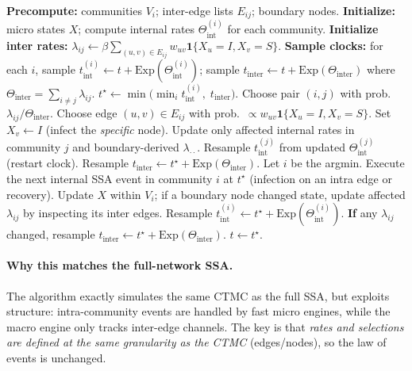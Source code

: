 \documentclass[11pt,a4paper]{article}
\begin{document}
\begin{algorithm}[h]
\caption{Exact micro--macro SSA for inter-community transmission (SSA-consistent)}
\begin{algorithmic}[1]
\State \textbf{Precompute:} communities $V_i$; inter-edge lists $E_{ij}$; boundary nodes.
\State \textbf{Initialize:} micro states $X$; compute internal rates $\Theta^{(i)}_{\text{int}}$ for each community.
\State \textbf{Initialize inter rates:} $\lambda_{ij} \gets \beta\sum_{(u,v)\in E_{ij}} w_{uv}\mathbf{1}\{X_u=I,X_v=S\}$.
\State \textbf{Sample clocks:} for each $i$, sample $t^{(i)}_{\text{int}} \gets t + \mathrm{Exp}(\Theta^{(i)}_{\text{int}})$;
sample $t_{\text{inter}} \gets t + \mathrm{Exp}(\Theta_{\text{inter}})$ where $\Theta_{\text{inter}}=\sum_{i\ne j}\lambda_{ij}$.
  \State $t^\star \gets \min\bigl(\min_i t^{(i)}_{\text{int}},\; t_{\text{inter}}\bigr)$.
     \State Choose pair $(i,j)$ with prob.\ $\lambda_{ij}/\Theta_{\text{inter}}$.
     \State Choose edge $(u,v)\in E_{ij}$ with prob.\ $\propto w_{uv}\mathbf{1}\{X_u=I,X_v=S\}$.
     \State Set $X_v \gets I$ (infect the \emph{specific} node).
     \State Update only affected internal rates in community $j$ and boundary-derived $\lambda_{\cdot\cdot}$.
     \State Resample $t^{(j)}_{\text{int}}$ from updated $\Theta^{(j)}_{\text{int}}$ (restart clock).
     \State Resample $t_{\text{inter}} \gets t^\star + \mathrm{Exp}(\Theta_{\text{inter}})$.
  \Else
     \State Let $i$ be the argmin. Execute the next internal SSA event in community $i$ at $t^\star$
            (infection on an intra edge or recovery).
     \State Update $X$ within $V_i$; if a boundary node changed state, update affected $\lambda_{ij}$ by inspecting
            its inter edges.
     \State Resample $t^{(i)}_{\text{int}} \gets t^\star + \mathrm{Exp}(\Theta^{(i)}_{\text{int}})$.
     \State \textbf{If} any $\lambda_{ij}$ changed, resample $t_{\text{inter}} \gets t^\star + \mathrm{Exp}(\Theta_{\text{inter}})$.
  \EndIf
  \State $t \gets t^\star$.
\EndWhile
\end{algorithmic}
\end{algorithm}

\paragraph{Why this matches the full-network SSA.}
The algorithm exactly simulates the same CTMC as the full SSA, but exploits structure:
intra-community events are handled by fast micro engines, while the macro engine only tracks inter-edge channels.
The key is that \emph{rates and selections are defined at the same granularity as the CTMC} (edges/nodes), so the
law of events is unchanged.
\end{document}
